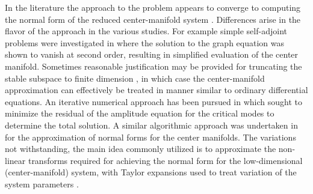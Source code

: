 In the literature the approach to the problem appears to converge to computing the normal form of the reduced center-manifold system \citep{knobloch83,guckenheimer83b,coullet83,haragus11}. Differences arise in the flavor of the approach in the various studies. For example simple self-adjoint problems were investigated in \cite{carr83} where the solution to the graph equation was shown to vanish at second order, resulting in simplified evaluation of the center manifold. Sometimes reasonable justification may be provided for truncating the stable subspace to finite dimension \citep{knobloch83,guckenheimer83b,fujimura97}, in which case the center-manifold approximation can effectively be treated in manner similar to ordinary differential equations. An iterative numerical approach has been pursued in \cite{roberts97} which sought to minimize the residual of the amplitude equation for the critical modes to determine the total solution. A similar algorithmic approach was undertaken in \cite{carini15} for the approximation of normal forms for the center manifolds. The variations not withstanding, the main idea commonly utilized is to approximate the non-linear transforms required for achieving the normal form for the low-dimensional (center-manifold) system, with Taylor expansions used to treat variation of the system parameters \citep{haragus11}. 

